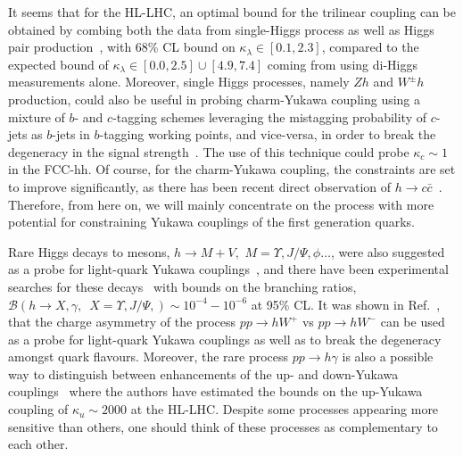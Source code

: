 It seems that for the HL-LHC, an optimal bound for the trilinear coupling can be obtained by combing both the data from single-Higgs process as well as Higgs pair production~\cite{DiVita:2017eyz}, with 68\% CL bound on $\kappa_\lambda \in[0.1,2.3]$, compared to the expected bound of $\kappa_\lambda \in [0.0,2.5] \cup [4.9,7.4]$ coming from using di-Higgs measurements alone. Moreover, single Higgs processes, namely $Zh$ and $ W^\pm h$ production, could also be useful in probing charm-Yukawa coupling using a mixture of $b$- and $c$-tagging schemes leveraging the mistagging probability of $c$-jets as $b$-jets in $b$-tagging working points, and vice-versa, in order to break the degeneracy in the signal strength~\cite{Perez:2015lra}. The use of this technique could probe $\kappa_c \sim 1$ in the FCC-hh. Of course, for the charm-Yukawa coupling, the constraints are set to improve significantly, as there has been recent direct observation of $h\to c \bar c$~\cite{ATLAS-CONF-2021-021}. Therefore, from here on, we will mainly concentrate  on the process with more potential for constraining Yukawa couplings of the first generation quarks. 

Rare Higgs decays to mesons, $h \to M +V ,\, \, M = \Upsilon, J/\Psi, \phi\dots$, were also suggested as a probe for light-quark Yukawa couplings~\cite{Bodwin:2013gca,Kagan:2014ila,Konig:2015qat}, and there have been experimental searches for these decays~\cite{ATLAS-CONF-2021-021,CMS:2018gcm} with bounds on the branching ratios, $\mathcal{B} (h \to X, \gamma, \,\,\, X =\Upsilon, J/\Psi,  ) \sim 10^{-4} - 10^{-6}$ at 95\% CL. It was shown in Ref.~\cite{Yu:2017vul}, that the charge asymmetry of the process $pp \to h W^+$ vs $ pp \to h W^-$ can be used as a probe for light-quark Yukawa couplings as well as to break the degeneracy amongst quark flavours. Moreover, the rare process $ pp \to h \gamma$ is also a possible way to distinguish between enhancements of the up- and down-Yukawa couplings~\cite{Aguilar-Saavedra:2020rgo} where the authors have estimated the bounds on the up-Yukawa coupling of $\kappa_u\sim 2000$ at the HL-LHC. Despite some processes appearing more sensitive than others, one should think of these processes as complementary to each other. 

